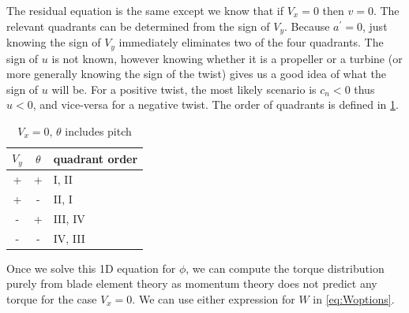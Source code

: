 \documentclass{article}
\begin{document}
The residual equation is the same except we know that if $V_x = 0$ then $v = 0$.  
The relevant quadrants can be determined from the sign of $V_y$.  Because $a^\prime = 0$, just knowing the sign of $V_y$ immediately eliminates two of the four quadrants.  The sign of $u$ is not known, however knowing whether it is a propeller or a turbine (or more generally knowing the sign of the twist) gives us a good idea of what the sign of $u$ will be.  For a positive twist, the most likely scenario is $c_n < 0$ thus $u < 0$, and vice-versa for a negative twist.  The order of quadrants is defined in \cref{tab:bracket2}.

\begin{table}[htb]
\centering
\caption{$V_x = 0$, $\theta$ includes pitch}
\label{tab:bracket2}
\begin{tabular}{@{}ccl@{}}
\toprule
$V_y$ & $\theta$ & quadrant order \\
\midrule
+ & + & I, II \\
+ & - & II, I \\
- & + & III, IV \\
- & - & IV, III \\
\bottomrule
\end{tabular}
\end{table}


Once we solve this 1D equation for $\phi$, we can compute the torque distribution purely from blade element theory as momentum theory does not predict any torque for the case $V_x = 0$. We can use either expression for $W$ in \cref{eq:Woptions}.
\end{document}
